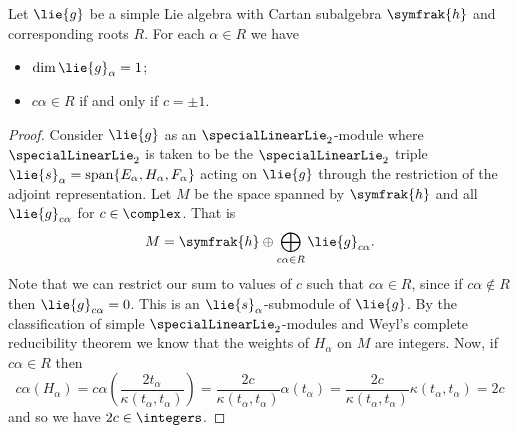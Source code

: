 \documentclass[fleqn]{NotesClass}
\DeclareMathOperator{\Span}{span}
\newcommand{\csa}{\symfrak{h}}
\begin{document}
    \begin{lma}{}{}
        Let \(\lie{g}\) be a simple Lie algebra with Cartan subalgebra \(\csa\) and corresponding roots \(R\).
        For each \(\alpha \in R\) we have
        \begin{itemize}
            \item \(\dim \lie{g}_\alpha = 1\);
            \item \(c\alpha \in R\) if and only if \(c = \pm 1\).
        \end{itemize}
        \begin{proof}
            Consider \(\lie{g}\) as an \(\specialLinearLie_2\)-module where \(\specialLinearLie_2\) is taken to be the \(\specialLinearLie_2\) triple \(\lie{s}_\alpha = \Span\{E_\alpha, H_\alpha, F_\alpha\}\) acting on \(\lie{g}\) through the restriction of the adjoint representation.
            Let \(M\) be the space spanned by \(\csa\) and all \(\lie{g}_{c\alpha}\) for \(c \in \complex\).
            That is
            \begin{equation}
                M = \csa \oplus \bigoplus_{c\alpha \in R} \lie{g}_{c\alpha}.
            \end{equation}
            Note that we can restrict our sum to values of \(c\) such that \(c\alpha \in R\), since if \(c\alpha \notin R\) then \(\lie{g}_{c\alpha} = 0\).
            This is an \(\lie{s}_\alpha\)-submodule of \(\lie{g}\).
            By the classification of simple \(\specialLinearLie_2\)-modules and Weyl's complete reducibility theorem we know that the weights of \(H_\alpha\) on \(M\) are integers.
            Now, if \(c\alpha \in R\) then
            \begin{equation}
                c\alpha(H_\alpha) = c\alpha\left( \frac{2t_\alpha}{\kappa(t_\alpha, t_\alpha)} \right) = \frac{2c}{\kappa(t_\alpha, t_\alpha)} \alpha(t_\alpha) = \frac{2c}{\kappa(t_\alpha, t_\alpha)} \kappa(t_\alpha, t_\alpha) = 2c
            \end{equation}
            and so we have \(2c \in \integers\).
            

\end{proof}
\end{lma}
\end{document}
